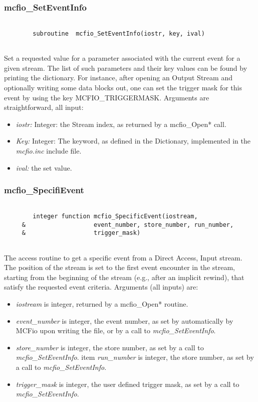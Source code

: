 \subsubsection{mcfio\_SetEventInfo}

\begin{verbatim}

        subroutine  mcfio_SetEventInfo(iostr, key, ival)
    
\end{verbatim}

Set a requested  value for a parameter associated with the current
event for a given stream. The list of such parameters and their key values 
can be found by printing the dictionary. For instance, after opening  an Output
Stream and optionally writing some data blocks out, one can set the trigger
mask for this event by using the key 
MCFIO\_TRIGGERMASK. Arguments are straightforward, all input:

\begin{itemize}
\item {\em iostr:} Integer: the Stream index, as returned by a mcfio\_Open* 
call.
\item {\em Key:} Integer: The keyword, as defined in the Dictionary, 
implemented in the {\em mcfio.inc} include file. 
\item {\em ival:} the  set value.
\end{itemize}

\subsubsection{mcfio\_SpecifiEvent}

\begin{verbatim}

        integer function mcfio_SpecificEvent(iostream, 
     &                   event_number, store_number, run_number, 
     &                   trigger_mask)
	
\end{verbatim}
The access routine to get a specific event from a Direct Access, Input stream.
The position of the stream is set to the first event encounter in the stream, 
starting from the beginning of the stream (e.g., after an implicit rewind),
that satisfy the requested event criteria. Arguments (all inputs) are:
\begin{itemize}
\item  {\em iostream}
is integer, returned by a mcfio\_Open* routine.
\item {\em event\_number} is integer, the event number, as set by automatically
by MCFio upon writing the file, or by a call to {\em  mcfio\_SetEventInfo}.
\item {\em store\_number} is integer, the store number, as set 
 by a call to {\em  mcfio\_SetEventInfo}.
item {\em run\_number} is integer, the store number, as set 
 by a call to {\em  mcfio\_SetEventInfo}.
\item {\em trigger\_mask} is integer, the user defined trigger mask, as set 
 by a call to {\em  mcfio\_SetEventInfo}.
\end{itemize}

